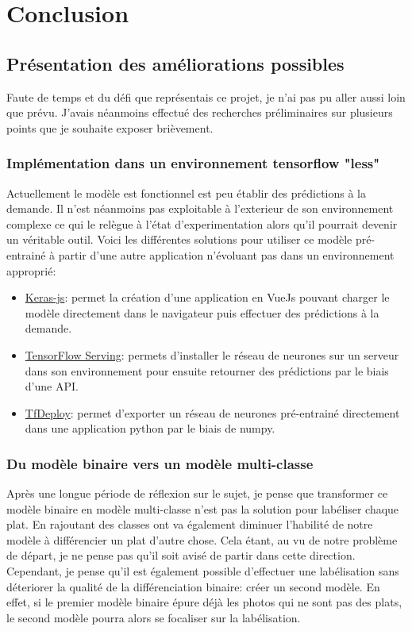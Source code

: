 \documentclass[a4paper,12pt]{report}
\begin{document}
  \chapter{Conclusion}

    \section{Présentation des améliorations possibles}
    Faute de temps et du défi que représentais ce projet, je n'ai pas pu aller aussi loin que prévu. J'avais néanmoins effectué des recherches préliminaires sur plusieurs points que je souhaite exposer brièvement.

      \subsection{Implémentation dans un environnement tensorflow "less"}
      Actuellement le modèle est fonctionnel est peu établir des prédictions à la demande. Il n'est néanmoins pas exploitable à l'exterieur de son environnement complexe ce qui le relègue à l'état d'experimentation alors qu'il pourrait devenir un véritable outil. 
      \medbreak
      Voici les différentes solutions pour utiliser ce modèle pré-entrainé à partir d'une autre application n'évoluant pas dans un environnement approprié:
      \begin{itemize}
        \item \href{<https://github.com/transcranial/keras-js/blob/master/README.md>}{Keras-js}: permet la création d'une application en VueJs pouvant charger le modèle directement dans le navigateur puis effectuer des prédictions à la demande.
        \item \href{<https://www.tensorflow.org/deploy/tfserve>}{TensorFlow Serving}: permets d'installer le réseau de neurones sur un serveur dans son environnement pour ensuite retourner des prédictions par le biais d'une API.
        \item \href{<https://github.com/riga/tfdeploy>}{TfDeploy}: permet d'exporter un réseau de neurones pré-entrainé directement dans une application python par le biais de numpy.
      \end{itemize}

      \subsection{Du modèle binaire vers un modèle multi-classe}
      Après une longue période de réflexion sur le sujet, je pense que transformer ce modèle binaire en modèle multi-classe n'est pas la solution pour labéliser chaque plat. En rajoutant des classes ont va également diminuer l'habilité de notre modèle à différencier un plat d'autre chose. Cela étant, au vu de notre problème de départ, je ne pense pas qu'il soit avisé de partir dans cette direction. 
      \medbreak
      Cependant, je pense qu'il est également possible d'effectuer une labélisation sans déteriorer la qualité de la différenciation binaire: créer un second modèle. En effet, si le premier modèle binaire épure déjà les photos qui ne sont pas des plats, le second modèle pourra alors se focaliser sur la labélisation.
\end{document}
